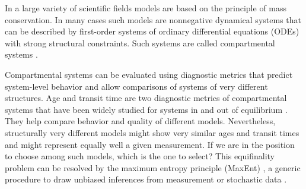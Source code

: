 \documentclass[smallextended]{svjour3}
\begin{document}
In a large variety of scientific fields %
models are based on the principle of mass conservation.
In many cases such models are nonnegative dynamical systems that can be described by first-order systems of ordinary differential equations (ODEs) with strong structural constraints.
Such systems are called compartmental systems \citep{Anderson1983, Walter1999, Haddad2010}.

Compartmental systems can be evaluated using diagnostic metrics that predict system-level behavior and allow comparisons of systems of very different structures. 
Age and transit time are two diagnostic metrics of compartmental systems that have been widely studied for systems in and out of equilibrium \citep{Eriksson1971ARoEaS, Bolin1973tellus, Rasmussen2016JMB, Sierra2016GlobChangBiol, Metzler2018MGS, MetzlerMuellerSierra2018PNAS}.
They help compare behavior and quality of different models.
Nevertheless, structurally very different models might show very similar ages and transit times and might represent equally well a given measurement.
If we are in the position to choose among such models, which is the one to select?
This equifinality problem can be resolved by the maximum entropy principle (MaxEnt) \citep{Jaynes1957PR1, Jaynes1957PR2}, a generic procedure to draw unbiased inferences from measurement or stochastic data \citep{Presse2013RMP}.
\end{document}
